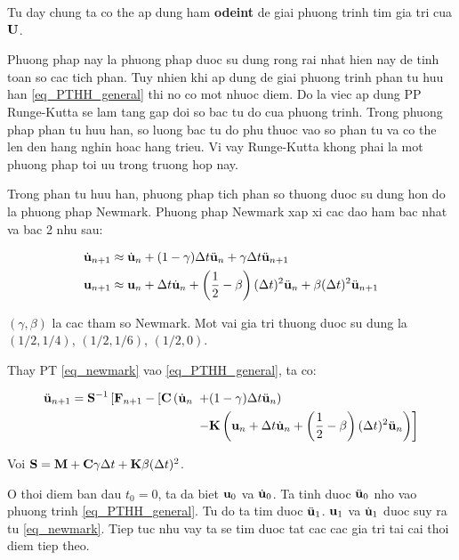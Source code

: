 Tu day chung ta co the ap dung ham \textbf{odeint} de giai phuong trinh tim gia tri cua ${\bf U}$.

Phuong phap nay la phuong phap duoc su dung rong rai nhat hien nay de tinh toan so cac tich phan. Tuy nhien khi ap dung de giai phuong trinh phan tu huu han \cref{eq_PTHH_general} thi no co mot nhuoc diem. Do la viec ap dung PP Runge-Kutta se lam tang gap doi so bac tu do cua phuong trinh. Trong phuong phap phan tu huu han, so luong bac tu do phu thuoc vao so phan tu va co the len den hang nghin hoac hang trieu. Vi vay Runge-Kutta khong phai la mot phuong phap toi uu trong truong hop nay.

Trong phan tu huu han, phuong phap tich phan so thuong duoc su dung hon do la phuong phap Newmark. Phuong phap Newmark xap xi cac dao ham bac nhat va bac 2 nhu sau:

\begin{equation}\label{eq_newmark}
    \begin{aligned}
    \dot{\bf u}_{n+1} &\approx \dot{\bf u}_n+(1-\gamma) \Delta t \ddot{\bf u}_n+\gamma \Delta t \ddot{\bf u}_{n+1}\\
    {\bf u}_{n+1} &\approx {\bf u}_n+\Delta t \dot{\bf u}_n+\left(\frac{1}{2}-\beta\right)(\Delta t)^2 \ddot{\bf u}_n+\beta(\Delta t)^2 \ddot{\bf u}_{n+1}
\end{aligned}
\end{equation}

$(\gamma, \beta)$ la cac tham so Newmark. Mot vai gia tri thuong duoc su dung la $(1/2, 1/4)$, $(1/2, 1/6)$, $(1/2, 0)$.

Thay PT \cref{eq_newmark} vao \cref{eq_PTHH_general}, ta co:

\begin{equation}
    \begin{aligned}
    \ddot{\bf u}_{n+1}={\bf S}^{-1}\left[{\bf F}_{n+1}-[{\bf C}\left(\dot{\bf u}_n\right.\right. & \left.+(1-\gamma) \Delta t \ddot{\bf u}_n\right) \\
& \left.-{\bf K}\left({\bf u}_n+\Delta t \dot{\bf u}_n+\left(\frac{1}{2}-\beta\right)(\Delta t)^2 \ddot{\bf u}_n\right)\right]
\end{aligned}
\end{equation}

Voi ${\bf S} = {\bf M} + {\bf C}\gamma\Delta t + {\bf K}\beta(\Delta t)^2$.

O thoi diem ban dau $t_0=0$, ta da biet ${\bf u}_0$ va $\dot{\bf u}_0$. Ta tinh duoc $\ddot{\bf u}_0$ nho vao phuong trinh \cref{eq_PTHH_general}. Tu do ta tim duoc $\ddot{\bf u}_1$. ${\bf u}_1$ va $\dot{\bf u}_1$ duoc suy ra tu \cref{eq_newmark}. Tiep tuc nhu vay ta se tim duoc tat cac cac gia tri tai cai thoi diem tiep theo.
